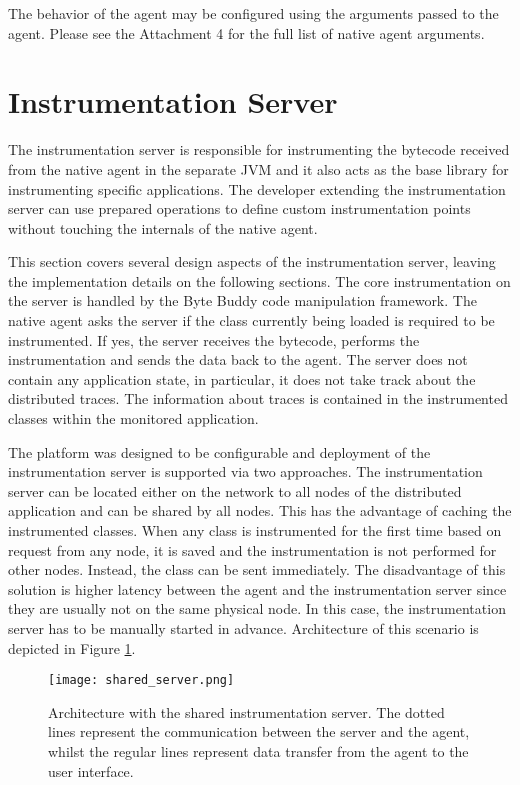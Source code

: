 The behavior of the agent may be configured using the arguments passed to the agent. Please see the Attachment 4 for the full list of native agent arguments.

\section{Instrumentation Server}
\label{sec:inst_server}
The instrumentation server is responsible for instrumenting the bytecode received from the native agent in the separate JVM and it also acts as the base library for instrumenting specific applications. The developer extending the instrumentation server can use prepared operations to define custom instrumentation points without touching the internals of the native agent.

This section covers several design aspects of the instrumentation server, leaving the implementation details on the following sections. The core instrumentation on the server is handled by the Byte Buddy code manipulation framework. The native agent asks the server if the class currently being loaded is required to be instrumented. If yes, the server receives the bytecode, performs the instrumentation and sends the data back to the agent. The server does not contain any application state, in particular, it does not take track about the distributed traces. The information about traces is contained in the instrumented classes within the monitored application.

The platform was designed to be configurable and deployment of the instrumentation server is supported via two approaches. The instrumentation server can be located either on the network to all nodes of the distributed application and can be shared by all nodes. This has the advantage of caching the instrumented classes. When any class is instrumented for the first time based on request from any node, it is saved and the instrumentation is not performed for other nodes. Instead, the class can be sent immediately. The disadvantage of this solution is higher latency between the agent and the instrumentation server since they are usually not on the same physical node. In this case, the instrumentation server has to be manually started in advance. Architecture of this scenario is depicted in Figure \ref{fig:shared_server}.
 
 \begin{figure}
 	\centering
 	\texttt{[image: shared\_server.png]}
 	\caption{Architecture with the shared instrumentation server. The dotted lines represent the communication between the server and the agent, whilst the regular lines represent data transfer from the agent to the user interface.}
 	\label{fig:shared_server}
 \end{figure}
 

